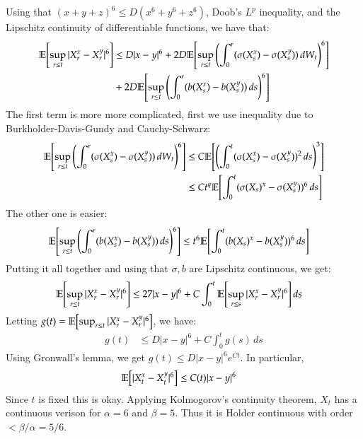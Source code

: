 \documentclass[12pt]{article}
\theoremstyle{definitionstyle}
\newcommand{\1}{\mathds 1}
\newcommand{\E}{\mathbb E \qty}
\begin{document}
    Using that $(x+y+z)^6 \leq D(x^6+y^6+z^6)$, Doob's $L^p$ inequality, and the Lipschitz continuity of differentiable functions, we have that:
    \begin{align*}
        \E[\sup_{r \leq t} |X_r^x - X_r^y|^6] &\leq D|x-y|^6 + 2D\E[\sup_{r \leq t} \qty(\int_0^r (\sigma(X_s^x) - \sigma(X_s^y)) \, dW_t)^6] 
        \\ &+ 2D\E[\sup_{r \leq t} \qty(\int_0^r (b(X_s^x) - b(X_s^y)) \, ds)^6] 
    \end{align*}
    The first term is more more complicated, first we use inequality due to Burkholder-Davis-Gundy and Cauchy-Schwarz:
    \begin{align*}
        \E[\sup_{r \leq t} \qty(\int_0^r (\sigma(X_s^x) - \sigma(X_s^y)) \, dW_t)^6] &\leq C\E[\qty(\int_0^t (\sigma(X_s^x) - \sigma(X_s^y))^2 \, ds)^3] 
        \\& \leq Ct^q \E[\int_0^t (\sigma(X_s)^x - \sigma(X_s^y))^6 \, ds]
    \end{align*}
    The other one is easier:
    \begin{align*}
        \E[\sup_{r \leq t} \qty(\int_0^r (b(X_s^x) - b(X_s^y)) \, ds)^6] &\leq t^6\E[\int_0^t (b(X_s)^x - b(X_s^y))^6 \, ds]
    \end{align*}
    Putting it all together and using that $\sigma, b$ are Lipschitz continuous, we get:
    \begin{align*}
        \E[\sup_{r \leq t} |X_r^x - X_r^y|^6] &\leq 27|x-y|^6 + C \int_0^t \E[\sup_{r \leq s} |X_r^x - X_r^y|^6] \, ds
    \end{align*}
    Letting $g(t) = \E[\sup_{r \leq t} |X_r^x - X_r^y|^6]$, we have:
    \begin{align*}
        g(t) &\leq D|x-y|^6 + C\int_0^t g(s) \, ds
    \end{align*}
    Using Gronwall's lemma, we get $g(t) \leq D|x-y|^6 e^{Ct}$. In particular,
    \begin{align*}
        \E[|X_t^x - X_t^y|^6] &\leq C(t) |x-y|^6
    \end{align*}
    Since $t$ is fixed this is okay. Applying Kolmogorov's continuity theorem, $X_t$ has a continuous verison for $\alpha = 6$ and $\beta = 5$. Thus it is Holder continuous with order $<\beta/\alpha = 5/6$.
    
\end{document}
